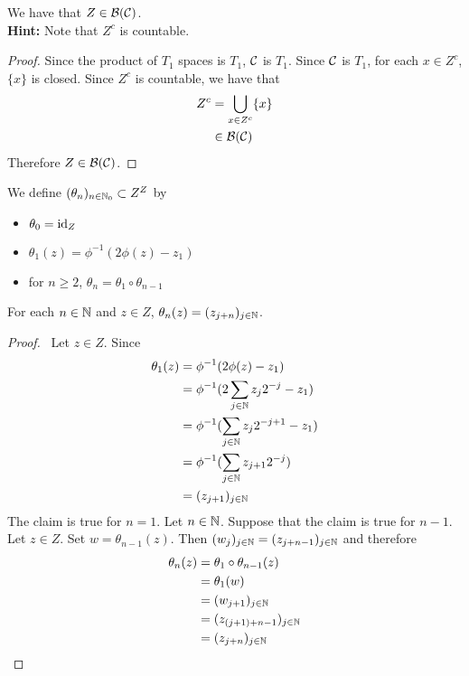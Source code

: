 \documentclass{book}
\begin{document}
	\begin{ex}  
		We have that $Z \in \mathcal{B}(\mathcal{C})$. \\
		\textbf{Hint:} Note that $Z^c$ is countable. 
	\end{ex}
	
	\begin{proof}
		Since the product of $T_1$ spaces is $T_1$, $\mathcal{C}$ is $T_1$. Since $\mathcal{C}$ is $T_1$, for each $x \in Z^c$, $\{x \}$ is closed. Since $Z^c$ is countable, we have that 
		\begin{align*}
			Z^c
			& = \bigcup_{x \in  Z^c} \{x\} \\
			& \in  \mathcal{B}(\mathcal{C})
		\end{align*} 
		Therefore $Z \in  \mathcal{B}(\mathcal{C})$.
	\end{proof}
	
	\begin{defn}  
		We define $(\theta_n)_{n \in \mathbb{N}_0} \subset Z^Z$ by
		\begin{itemize}
			\item 	$\theta_0 = \operatorname{id}_Z$
			\item $\theta_1 (z) = \phi^{-1}(2 \phi(z) - z_1)$ 
			\item for $n \geq 2$, $\theta_n = \theta_1 \circ \theta_{n-1}$
		\end{itemize}
	\end{defn}
	
	\begin{ex}  
		For each $n \in \mathbb{N}$ and $z \in Z$, $\theta_n(z) = (z_{j+n})_{j \in \mathbb{N}}$.
	\end{ex}
	
	\begin{proof} \
		Let $z \in Z$. Since  
		\begin{align*}
			\theta_1(z) 
			& = \phi^{-1}(2 \phi(z) - z_1) \\
			& = \phi^{-1}(2 \sum_{j \in \mathbb{N}} z_j2^{-j} - z_1) \\
			& = \phi^{-1}(\sum_{j \in \mathbb{N}} z_j2^{-j+1} - z_1) \\
			& = \phi^{-1}(\sum_{j \in \mathbb{N}} z_{j+1}2^{-j}) \\
			& = (z_{j+1})_{j \in \mathbb{N}}
		\end{align*}
		The claim is true for $n =1$. Let $n \in \mathbb{N}$. Suppose that the claim is true for $n-1$. Let $z \in Z$. Set $w = \theta_{n-1}(z)$. Then $(w_{j})_{j \in \mathbb{N}} = (z_{j+n -1})_{j \in \mathbb{N}}$ and therefore
		\begin{align*}
			\theta_n(z) 
			& = \theta_1 \circ \theta_{n-1} (z) \\
			& = \theta_1 (w) \\
			& = (w_{j + 1})_{j \in \mathbb{N}} \\
			& = (z_{(j+ 1) +  n-1} )_{j \in \mathbb{N}} \\
			& = (z_{j+  n })_{j \in \mathbb{N}}
		\end{align*}
	\end{proof}
	
\end{document}
